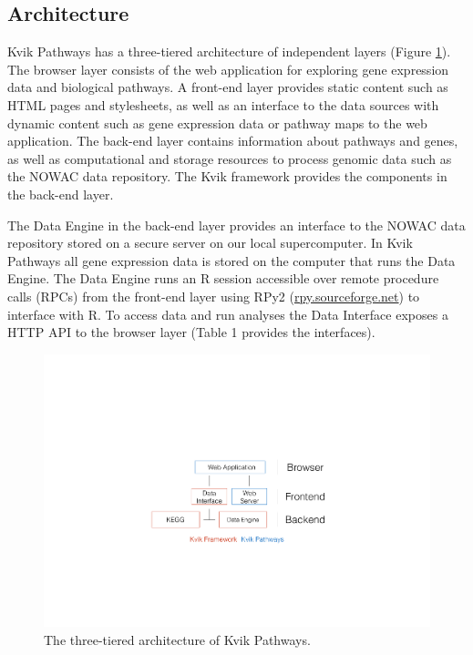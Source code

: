 \subsection{Architecture} 
Kvik Pathways has a three-tiered architecture of independent layers (Figure
\ref{fig:arch}). The browser layer consists of the web application for
exploring gene expression data and biological pathways. A front-end layer
provides static content such as HTML pages and stylesheets, as well as an
interface to the data sources with dynamic content such as gene expression
data or pathway maps to the web application. The back-end layer contains
information about pathways and genes, as well as computational and storage
resources to process genomic data such as the NOWAC data repository. The
Kvik framework provides the components in the back-end layer. 

The Data Engine in the back-end layer provides an interface to the NOWAC data
repository stored on a secure server on our local supercomputer. In Kvik
Pathways all gene expression data is stored on the computer that runs the Data
Engine. The Data Engine runs an R session accessible over remote procedure calls
(RPCs) from the front-end layer using RPy2
(\href{rpy.sourceforge.net}{rpy.sourceforge.net}) to interface with R. To access
data and run analyses the Data Interface exposes a HTTP API to the browser layer
(Table 1 provides the interfaces).

\begin{figure}[htb]
    \begin{centering}
    \includegraphics[width=\textwidth]{figures/archv2.pdf}
    \caption{The three-tiered architecture of Kvik Pathways.} 
    \label{fig:arch}
    \end{centering} 
\end{figure}   

